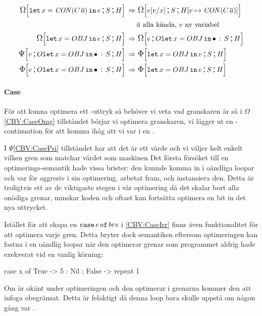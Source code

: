 \documentclass[../Optimise]{subfiles}
\begin{document}
\begin{align}
\label{CBV:OLet1} \OMEGA SH{\eLet x{\CON{C}{\many{a}}}{e}}  \rulesep &\, \OMEGA S{\heap{v}{\CON{C}{\many{a}}}}{e[v/x]}\\
 & \many{a} \text{ alla kända, } v \text{ ny variabel} \nonumber \\
\label{CBV:OLet2}\OMEGA SH{\eLet x{OBJ}{e}}  \rulesep &\, \OMEGA{\oLetObj x{OBJ}S}He\\
\PSI{\oLetObj x{OBJ}S}Hv  \rulesep &\, \IRR SH{\eLet x{OBJ}v}\\
\IRR{\oLetObj x{OBJ}S}He  \rulesep &\, \IRR SH{\eLet x{OBJ}e}
\end{align}


\paragraph{Case}
\label{cbv:case}
För att kunna optimera ett -uttryk så behöver vi veta vad granskaren är
så i $\Omega$\eqref{CBV:CaseOmg} tillståndet börjar vi optimera granskaren, vi lägger ut en
-continuation för att komma ihåg att vi var i en .

I $\Psi$\eqref{CBV:CasePsi} tillståndet har att det är ett värde och vi  väljer 
helt enkelt vilken gren som matchar värdet som maskinen Det första försöket till en optimerings-semantik hade vissa brister: den kunnde komma in i
oändliga loopar och var för aggresiv i sin optimering. 
arbetat fram, och instansiera den.
Detta är troligtvis ett av de viktigaste stegen i vår optimering då det skalar bort alla onödiga 
grenar, minskar koden och oftast kan fortsätta optimera en bit in det nya uttrycket.

Istället för att skapa en $\eCase e brs$ i \eqref{CBV:CaseIrr} finns även
funktionalitet för att
optimera varje gren. Detta bryter dock semantiken eftersom optimeringen kan fastna
i en oändlig loopar när den optimerar grenar som programmet aldrig hade exekverat
vid en vanlig körning: 

\begin{codeEx}
case x of
    { True  -> 5 : Nil
    ; False -> repeat 1
    }
\end{codeEx}

Om  är okänt under optimeringen och den optimerar i grenarna kommer den
att infoga  obegränsat. Detta är felaktigt då denna loop bara skulle uppstå
om  någon gång var .
\end{document}
